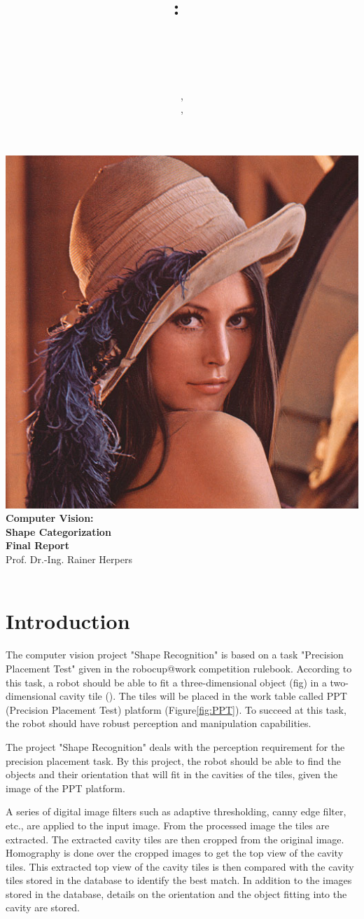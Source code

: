 \documentclass{article}
\title{
\vspace{2in}
\textmd{\textbf{\hmwkClass:\ \\ \hmwkTitle}}\\
\vspace{0.1in}\large{\hmwkClassInstructor\ }
\vspace{3in}
}
\author{\textbf{\hmwkAuthorName}, \hmwkfirstmat\\ \textbf{\hmwksecondauthor}, \hmwksecondmat}
\date{} %
\newcommand{\hmwkTitle}{Shape Categorization\\Final Report} %
\newcommand{\hmwkClass}{Computer Vision} %
\newcommand{\hmwkClassInstructor}{Prof. Dr.-Ing. Rainer Herpers} %
\newcommand{\hmwkimage}{\centering\includegraphics[draft=false, scale = 0.075]{images/FrontPicture.png}}
\begin{document}
\begin{titlepage}
\hmwkimage\\
\vspace{1in}
\textmd{\Huge\textbf{\hmwkClass:\ \\ \hmwkTitle}}\\
\vspace{0.1in}\large{\hmwkClassInstructor\ }
\vspace{3in}\\
\theauthor\
\thispagestyle{empty}
\end{titlepage}


\setcounter{page}{1}

\tableofcontents

\newpage


\section{Introduction}

 The computer vision project "Shape Recognition" is based on a task "Precision Placement Test" given in the robocup@work competition rulebook. According to this task, a robot should be able to fit a three-dimensional object (fig) in a two-dimensional cavity tile (). The tiles will be placed in the work table called PPT (Precision Placement Test) platform (Figure\ref{fig:PPT}). To succeed at this task, the robot should have robust perception and manipulation capabilities.
 
	The project "Shape Recognition" deals with the perception requirement for the precision placement task.
By this project, the robot should be able to find the objects and their orientation that will fit in the cavities of the tiles, given the image of the PPT platform.

	A series of digital image filters such as adaptive thresholding, canny edge filter, etc.,  are applied to the input image. From the processed image the tiles are extracted. The extracted cavity tiles are then cropped from the original image. Homography is done over the cropped images to get the top view of the cavity tiles. This extracted top view of the cavity tiles is then compared with the cavity tiles stored in the database to identify the best match. In addition to the images stored in the database, details on the orientation and the object fitting into the cavity are stored.
\end{document}
